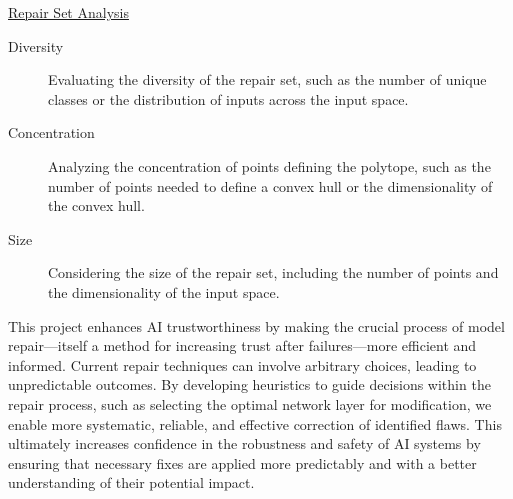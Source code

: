 \documentclass{article}
\begin{document}
\underline{Repair Set Analysis}
\begin{description}
    \item[Diversity] Evaluating the diversity of the repair set, such as the number of unique classes or the distribution of inputs across the input space.
    \item[Concentration] Analyzing the concentration of points defining the polytope, such as the number of points needed to define a convex hull or the dimensionality of the convex hull.
    \item[Size] Considering the size of the repair set, including the number of points and the dimensionality of the input space.
\end{description}

This project enhances AI trustworthiness by making the crucial process of model repair—itself a method for increasing trust after failures—more efficient and informed. Current repair techniques can involve arbitrary choices, leading to unpredictable outcomes. By developing heuristics to guide decisions within the repair process, such as selecting the optimal network layer for modification, we enable more systematic, reliable, and effective correction of identified flaws. This ultimately increases confidence in the robustness and safety of AI systems by ensuring that necessary fixes are applied more predictably and with a better understanding of their potential impact.



\end{document}
